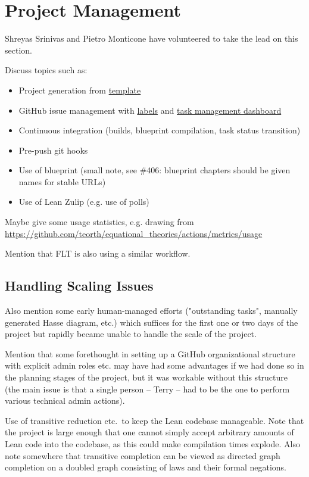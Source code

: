 \section{Project Management}\label{project-sec}


Shreyas Srinivas and Pietro Monticone have volunteered to take the lead on this section.

Discuss topics such as:
\begin{itemize}
    \item Project generation from \href{https://github.com/pitmonticone/LeanProject}{template}
    \item GitHub issue management with \href{https://github.com/teorth/equational_theories/labels}{labels} and \href{https://github.com/users/teorth/projects/1}{task management dashboard}
    \item Continuous integration (builds, blueprint compilation, task status transition)
    \item Pre-push git hooks
    \item Use of blueprint (small note, see \#406: blueprint chapters should be given names for stable URLs)
    \item Use of Lean Zulip (e.g. use of polls)
\end{itemize}

Maybe give some usage statistics, e.g. drawing from \url{https://github.com/teorth/equational_theories/actions/metrics/usage}

Mention that FLT is also using a similar workflow.

\subsection{Handling Scaling Issues}

Also mention some early human-managed efforts ("outstanding tasks", manually generated Hasse diagram, etc.) which suffices for the first one or two days of the project but rapidly became unable to handle the scale of the project.

Mention that some forethought in setting up a GitHub organizational structure with explicit admin roles etc. may have had some advantages if we had done so in the planning stages of the project, but it was workable without this structure (the main issue is that a single person -- Terry -- had to be the one to perform various technical admin actions).

Use of transitive reduction etc.\ to keep the Lean codebase manageable. Note that the project is large enough that one cannot simply accept arbitrary amounts of Lean code into the codebase, as this could make compilation times explode. Also note somewhere that transitive completion can be viewed as directed graph completion on a doubled graph consisting of laws and their formal negations.

